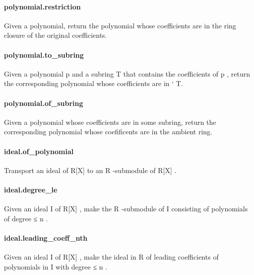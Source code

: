 \documentclass{article}
\begin{document}
\paragraph{polynomial.restriction}
\par
Given a polynomial, return the polynomial whose coefficients are in
the ring closure of the original coefficients.
\paragraph{polynomial.to\_subring}
\par
Given a polynomial 
\colorbox[RGB]{253,246,227}{{{{\color[RGB]{101, 123, 131} p }}}} and a subring 
\colorbox[RGB]{253,246,227}{{{{\color[RGB]{101, 123, 131} T }}}} that contains the coefficients of 
\colorbox[RGB]{253,246,227}{{{{\color[RGB]{101, 123, 131} p }}}},
return the corresponding polynomial whose coefficients are in 
`
T.
\paragraph{polynomial.of\_subring}
\par
Given a polynomial whose coefficients are in some subring, return
the corresponding polynomial whose coefificents are in the ambient ring.
\paragraph{ideal.of\_polynomial}
\par
Transport an ideal of 
\colorbox[RGB]{253,246,227}{{{{\color[RGB]{101, 123, 131} R{[}X{]} }}}} to an 
\colorbox[RGB]{253,246,227}{{{{\color[RGB]{101, 123, 131} R }}}}-submodule of 
\colorbox[RGB]{253,246,227}{{{{\color[RGB]{101, 123, 131} R{[}X{]} }}}}.
\paragraph{ideal.degree\_le}
\par
Given an ideal 
\colorbox[RGB]{253,246,227}{{{{\color[RGB]{101, 123, 131} I }}}} of 
\colorbox[RGB]{253,246,227}{{{{\color[RGB]{101, 123, 131} R{[}X{]} }}}}, make the 
\colorbox[RGB]{253,246,227}{{{{\color[RGB]{101, 123, 131} R }}}}-submodule of 
\colorbox[RGB]{253,246,227}{{{{\color[RGB]{101, 123, 131} I }}}}consisting of polynomials of degree ≤ 
\colorbox[RGB]{253,246,227}{{{{\color[RGB]{101, 123, 131} n }}}}.
\paragraph{ideal.leading\_coeff\_nth}
\par
Given an ideal 
\colorbox[RGB]{253,246,227}{{{{\color[RGB]{101, 123, 131} I }}}} of 
\colorbox[RGB]{253,246,227}{{{{\color[RGB]{101, 123, 131} R{[}X{]} }}}}, make the ideal in 
\colorbox[RGB]{253,246,227}{{{{\color[RGB]{101, 123, 131} R }}}} of
leading coefficients of polynomials in 
\colorbox[RGB]{253,246,227}{{{{\color[RGB]{101, 123, 131} I }}}} with degree ≤ 
\colorbox[RGB]{253,246,227}{{{{\color[RGB]{101, 123, 131} n }}}}.
\end{document}
